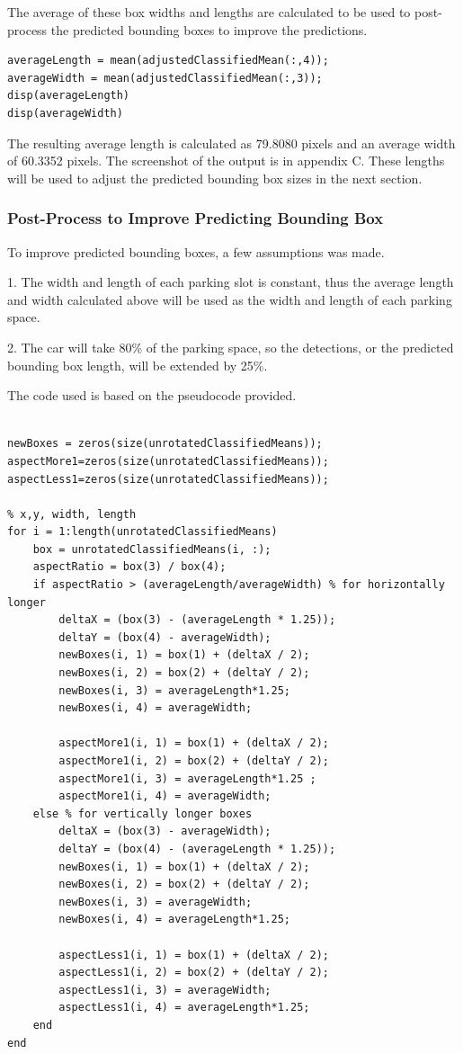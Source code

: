 \documentclass[man]{apa7}
\begin{document}
The average of these box widths and lengths are calculated to be used to post-process the predicted bounding boxes to improve the predictions.

\begin{lstlisting}[]
averageLength = mean(adjustedClassifiedMean(:,4));
averageWidth = mean(adjustedClassifiedMean(:,3));
disp(averageLength)
disp(averageWidth)
\end{lstlisting}

The resulting average length is calculated as 79.8080 pixels and an average width of 60.3352 pixels. The screenshot of the output is in appendix C. These lengths will be used to adjust the predicted bounding box sizes in the next section. 

\subsubsection{Post-Process to Improve Predicting Bounding Box}

To improve predicted bounding boxes, a few assumptions was made. 

1. The width and length of each parking slot is constant, thus the average length and width calculated above will be used as the width and length of each parking space.

2. The car will take 80\% of the parking space, so the detections, or the predicted bounding box length, will be extended by 25\%.

The code used is based on the pseudocode provided.
\begin{lstlisting}[]

newBoxes = zeros(size(unrotatedClassifiedMeans));
aspectMore1=zeros(size(unrotatedClassifiedMeans));
aspectLess1=zeros(size(unrotatedClassifiedMeans));

% x,y, width, length
for i = 1:length(unrotatedClassifiedMeans)
    box = unrotatedClassifiedMeans(i, :);
    aspectRatio = box(3) / box(4);
    if aspectRatio > (averageLength/averageWidth) % for horizontally longer
        deltaX = (box(3) - (averageLength * 1.25));
        deltaY = (box(4) - averageWidth);
        newBoxes(i, 1) = box(1) + (deltaX / 2);
        newBoxes(i, 2) = box(2) + (deltaY / 2);
        newBoxes(i, 3) = averageLength*1.25;
        newBoxes(i, 4) = averageWidth;

        aspectMore1(i, 1) = box(1) + (deltaX / 2);
        aspectMore1(i, 2) = box(2) + (deltaY / 2);
        aspectMore1(i, 3) = averageLength*1.25 ;
        aspectMore1(i, 4) = averageWidth;
    else % for vertically longer boxes
        deltaX = (box(3) - averageWidth);
        deltaY = (box(4) - (averageLength * 1.25));
        newBoxes(i, 1) = box(1) + (deltaX / 2);
        newBoxes(i, 2) = box(2) + (deltaY / 2);
        newBoxes(i, 3) = averageWidth;
        newBoxes(i, 4) = averageLength*1.25;

        aspectLess1(i, 1) = box(1) + (deltaX / 2);
        aspectLess1(i, 2) = box(2) + (deltaY / 2);
        aspectLess1(i, 3) = averageWidth;
        aspectLess1(i, 4) = averageLength*1.25;
    end
end
\end{lstlisting}
\end{document}
